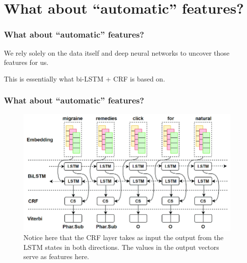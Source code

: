 \documentclass{beamer}
\begin{document}
\section{What about ``automatic'' features?}
\begin{frame}
    \frametitle{What about ``automatic'' features?}
    We rely solely on the data itself and deep neural networks to uncover those features for us. 
    
    \vspace{10pt}
    
    This is essentially what bi-LSTM + CRF is based on.
\end{frame}

\begin{frame}
    \frametitle{What about ``automatic'' features?}
    \begin{figure}
        \includegraphics[scale=0.25]{bilstm-crf}
        \caption{Notice here that the CRF layer takes as input the output from the LSTM states in both directions. The values in the output vectors serve as features here.}
    \end{figure}

\end{frame}

%
%
\end{document}
